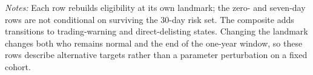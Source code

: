 \begin{table}[!htbp]\centering
\caption{Independently Rebuilt Risk Sets by Washout}\label{tab:a_washout}
\begin{minipage}{\textwidth}\footnotesize\textit{Notes:} Each row rebuilds eligibility at its own landmark; the zero- and seven-day rows are not conditional on surviving the 30-day risk set. The composite adds transitions to trading-warning and direct-delisting states. Changing the landmark changes both who remains normal and the end of the one-year window, so these rows describe alternative targets rather than a parameter perturbation on a fixed cohort.\end{minipage}
\end{table}
